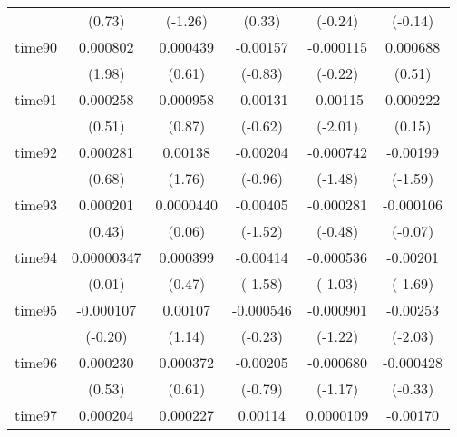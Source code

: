 \begin{table}[htbp]
\begin{tabular}{l*{5}{c}}
            &      (0.73)         &     (-1.26)         &      (0.33)         &     (-0.24)         &     (-0.14)         \\
time90      &    0.000802\sym{*}  &    0.000439         &    -0.00157         &   -0.000115         &    0.000688         \\
            &      (1.98)         &      (0.61)         &     (-0.83)         &     (-0.22)         &      (0.51)         \\
time91      &    0.000258         &    0.000958         &    -0.00131         &    -0.00115\sym{*}  &    0.000222         \\
            &      (0.51)         &      (0.87)         &     (-0.62)         &     (-2.01)         &      (0.15)         \\
time92      &    0.000281         &     0.00138         &    -0.00204         &   -0.000742         &    -0.00199         \\
            &      (0.68)         &      (1.76)         &     (-0.96)         &     (-1.48)         &     (-1.59)         \\
time93      &    0.000201         &   0.0000440         &    -0.00405         &   -0.000281         &   -0.000106         \\
            &      (0.43)         &      (0.06)         &     (-1.52)         &     (-0.48)         &     (-0.07)         \\
time94      &  0.00000347         &    0.000399         &    -0.00414         &   -0.000536         &    -0.00201         \\
            &      (0.01)         &      (0.47)         &     (-1.58)         &     (-1.03)         &     (-1.69)         \\
time95      &   -0.000107         &     0.00107         &   -0.000546         &   -0.000901         &    -0.00253\sym{*}  \\
            &     (-0.20)         &      (1.14)         &     (-0.23)         &     (-1.22)         &     (-2.03)         \\
time96      &    0.000230         &    0.000372         &    -0.00205         &   -0.000680         &   -0.000428         \\
            &      (0.53)         &      (0.61)         &     (-0.79)         &     (-1.17)         &     (-0.33)         \\
time97      &    0.000204         &    0.000227         &     0.00114         &   0.0000109         &    -0.00170         \\

\end{tabular}
\end{table}
